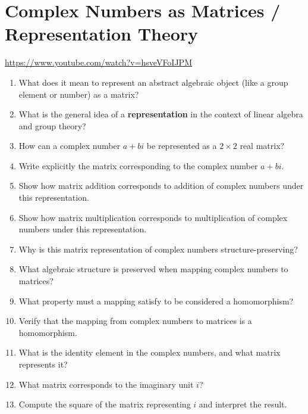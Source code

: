\section{Complex Numbers as Matrices / Representation Theory}

\url{https://www.youtube.com/watch?v=hsveVFoIJPM}

\begin{enumerate}

\item What does it mean to represent an abstract algebraic object (like a group element or number) as a matrix?

\item What is the general idea of a \textbf{representation} in the context of linear algebra and group theory?

\item How can a complex number $a + bi$ be represented as a $2 \times 2$ real matrix?

\item Write explicitly the matrix corresponding to the complex number $a + bi$.

\item Show how matrix addition corresponds to addition of complex numbers under this representation.

\item Show how matrix multiplication corresponds to multiplication of complex numbers under this representation.

\item Why is this matrix representation of complex numbers structure-preserving?

\item What algebraic structure is preserved when mapping complex numbers to matrices?

\item What property must a mapping satisfy to be considered a homomorphism?

\item Verify that the mapping from complex numbers to matrices is a homomorphism.

\item What is the identity element in the complex numbers, and what matrix represents it?

\item What matrix corresponds to the imaginary unit $i$?

\item Compute the square of the matrix representing $i$ and interpret the result.


\end{enumerate}
